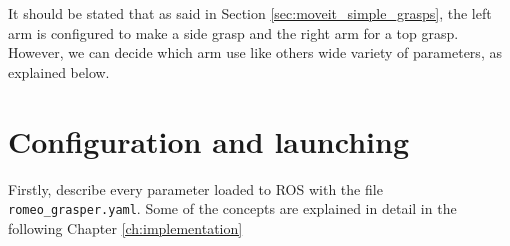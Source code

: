 \documentclass[12pt,a4paper,final,twoside,openright]{report}
\begin{document}
It should be stated that as said in Section \ref{sec:moveit_simple_grasps}, the left arm is configured to make a side grasp and the right arm for a top grasp. However, we can decide which arm use like others wide variety of parameters, as explained below. 

\section{Configuration and launching}
\label{sec:design_config}

Firstly, describe every parameter loaded to ROS with the file \texttt{romeo\_grasper.yaml}. Some of the concepts are explained in detail in the following Chapter \ref{ch:implementation}%
\end{document}
